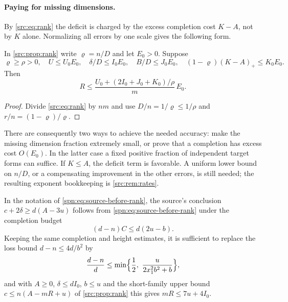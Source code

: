 \paragraph{Paying for missing dimensions.}
By \eqref{src:eq:rank} the deficit is charged by the excess completion cost $K-A$, not by $K$
alone. Normalizing all errors by one scale gives the following form.

\begin{corollary}\label{spn:cor:rank-error}
In \cref{src:prop:rank} write $\varrho=n/D$ and let $E_0>0$. Suppose
\[
 \varrho\ge\rho>0,\quad U\le U_0E_0,\quad \delta/D\le I_0E_0,\quad
 B/D\le J_0E_0,\quad(1-\varrho)(K-A)_+\le K_0E_0 .
\]
Then
\begin{equation}\label{spn:eq:rank-error}
 R\le\frac{U_0+(2I_0+J_0+K_0)/\rho}{m}\,E_0 .
\end{equation}
\end{corollary}

\begin{proof}
Divide \eqref{src:eq:rank} by $nm$ and use $D/n=1/\varrho\le1/\rho$ and
$r/n=(1-\varrho)/\varrho$.
\end{proof}

There are consequently two ways to achieve the needed accuracy: make the
missing dimension fraction extremely small, or prove that a completion has
excess cost $O(E_0)$. In the latter case a fixed positive fraction of
independent target forms can suffice. If $K\le A$, the deficit term is
favorable. A uniform lower bound on $n/D$, or a compensating improvement in
the other errors, is still needed; the resulting exponent bookkeeping is
\cref{src:rem:rates}.

\begin{proposition}\label{spn:prop:weakening}
In the notation of \eqref{spn:eq:source-before-rank}, the source's conclusion
$c+2\delta\ge d(A-3u)$ follows from \eqref{spn:eq:source-before-rank} under the completion
budget
\begin{equation}\label{spn:eq:weaker-spanning}
 (d-n)C\le d(2u-b).
\end{equation}
Keeping the same completion and height estimates, it is sufficient to replace
the loss bound $d-n\le4d/b^2$ by
\[
 \frac{d-n}{d}\le\min\Bigl\{\frac12,\ \frac{u}{2x_1^2b^2+b}\Bigr\},
\]
and with $A\ge0$, $\delta\le dI_0$, $b\le u$ and the short-family upper bound
$c\le n(A-mR+u)$ of \cref{src:prop:rank} this gives $mR\le7u+4I_0$.
\end{proposition}

